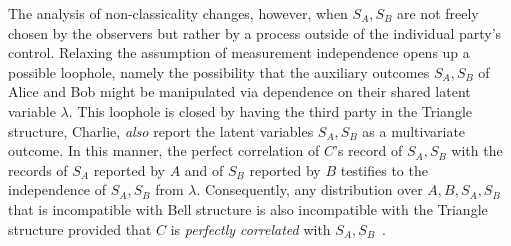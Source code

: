\documentclass[aps, 10pt, english, twoside, pra, nofootinbib, tightenlines, longbibliography, superscriptaddress]{revtex4-1}
\begin{document}
    The analysis of non-classicality changes, however, when $S_{A}, S_{B}$ are not freely chosen by the observers but rather by a process outside of the individual party's control. Relaxing the assumption of measurement independence opens up a possible loophole, namely the possibility that the auxiliary outcomes $S_{A}, S_{B}$ of Alice and Bob might be manipulated via dependence on their shared latent variable $\lambda$. This loophole is closed by having the third party in the Triangle structure, Charlie, \emph{also} report the latent variables $S_{A}, S_{B}$ as a multivariate outcome. In this manner, the perfect correlation of $C$'s record of $S_{A}, S_{B}$ with the records of $S_{A}$ reported by $A$ and of $S_{B}$ reported by $B$ testifies to the independence of $S_{A}, S_{B}$ from $\lambda$. Consequently, any distribution over $A, B, S_{A}, S_{B}$ that is incompatible with Bell structure is also incompatible with the Triangle structure provided that $C$ is \textit{perfectly correlated} with $S_{A}, S_{B}$~\cite{Fritz_2012}.
\end{document}

